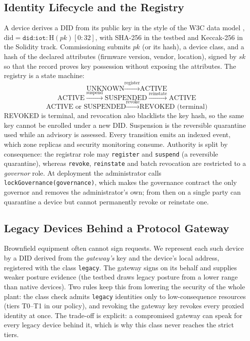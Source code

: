 \subsection{Identity Lifecycle and the Registry}\label{sec:identity}
A device derives a DID from its public key in the style of the W3C data model \cite{w3cdid2022}, $\mathrm{did}=\texttt{did:iot:}\,\mathrm{H}(pk)[0{:}32]$, with SHA-256 in the testbed and Keccak-256 in the Solidity track. Commissioning submits $pk$ (or its hash), a device class, and a hash of the declared attributes (firmware version, vendor, location), signed by $sk$ so that the record proves key possession without exposing the attributes. The registry is a state machine:
\[
\text{UNKNOWN} \xrightarrow{\text{register}} \text{ACTIVE}
\]
\[
\text{ACTIVE} \xrightarrow{\text{suspend}} \text{SUSPENDED} \xrightarrow{\text{reinstate}} \text{ACTIVE}
\]
\[
\text{ACTIVE or SUSPENDED} \xrightarrow{\text{revoke}} \text{REVOKED (terminal)}
\]
REVOKED is terminal, and revocation also blacklists the key hash, so the same key cannot be enrolled under a new DID. Suspension is the reversible quarantine used while an advisory is assessed. Every transition emits an indexed event, which zone replicas and security monitoring consume. Authority is split by consequence: the registrar role may \texttt{register} and \texttt{suspend} (a reversible quarantine), whereas \texttt{revoke}, \texttt{reinstate} and batch revocation are restricted to a \emph{governor} role. At deployment the administrator calls \texttt{lockGovernance(governance)}, which makes the governance contract the only governor and removes the administrator's own; from then on a single party can quarantine a device but cannot permanently revoke or reinstate one.

\subsection{Legacy Devices Behind a Protocol Gateway}\label{sec:legacy}
Brownfield equipment often cannot sign requests. We represent each such device by a DID derived from the \emph{gateway's} key and the device's local address, registered with the class \texttt{legacy}. The gateway signs on its behalf and supplies weaker posture evidence (the testbed draws legacy posture from a lower range than native devices). Two rules keep this from lowering the security of the whole plant: the class check admits \texttt{legacy} identities only to low-consequence resources (tiers T0--T1 in our policy), and revoking the gateway key revokes every proxied identity at once. The trade-off is explicit: a compromised gateway can speak for every legacy device behind it, which is why this class never reaches the strict tiers.


